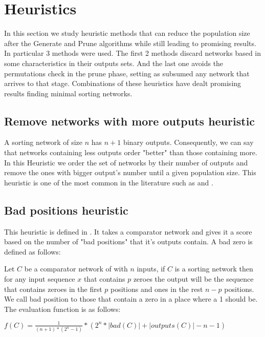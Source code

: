 \documentclass[../main.tex]{subfiles}
\begin{document}
	\section{Heuristics}
	In this section we study heuristic methods that can reduce the population size after the Generate and Prune algorithms while still leading to promising results. In particular 3 methods were used. The first 2 methods discard networks based in some characteristics in their outputs sets. And the last one avoids the permutations check in the prune phase, setting as subsumed any network that arrives to that stage. Combinations of these heuristics have dealt promising results finding minimal sorting networks.
	
	\subsection{Remove networks with more outputs heuristic}
	A sorting network of size $n$ has $n+1$ binary outputs. Consequently, we can say that networks containing less outputs order "better" than those containing more. In this Heuristic we order the set of networks by their number of outputs and remove the ones with bigger output's number until a given population size. This heuristic is one of the most common in the literature such as \cite{Sekanina2005} and \cite{SortingNetworkIsomorphism}.
	
	\subsection{Bad positions heuristic}
	This heuristic is defined in \cite{FRASINARU2019447}. It takes a comparator network and gives it a score based on the number of "bad positions" that it's outputs contain. A bad zero is defined as follows:
	
	Let $C$ be a comparator network of with $n$ inputs, if $C$ is a sorting network then for any input sequence $x$ that contains $p$ zeroes the output will be the sequence that contains zeroes in the first $p$ positions and ones in the rest $n-p$ positions. We call bad position to those that contain a zero in a place where a 1 should be. The evaluation function is as follows:
	
	$f(C)=\frac{1}{(n+1)*(2^n-1)}*(2^n * |bad(C)| + |outputs(C)| - n -1)$
	
\end{document}
